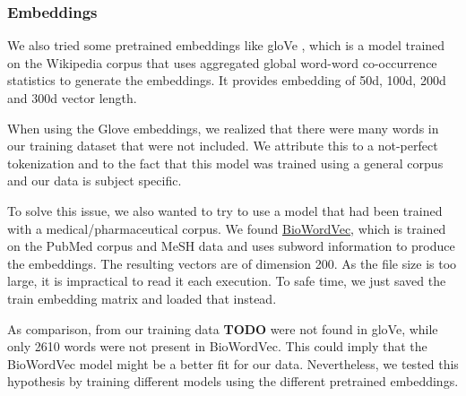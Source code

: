 \subsubsection{Embeddings}
We also tried some pretrained embeddings like gloVe \cite{glove}, which is a model trained on the Wikipedia corpus that uses aggregated global word-word co-occurrence statistics to generate the embeddings. It provides embedding of 50d, 100d, 200d and 300d vector length. 

When using the Glove embeddings, we realized that there were many words in our training dataset that were not included. We attribute this to a not-perfect tokenization and to the fact that this model was trained using a general corpus and our data is subject specific.

To solve this issue, we also wanted to try to use a model that had been trained with a medical/pharmaceutical corpus. We found \href{https://github.com/ncbi-nlp/BioWordVec}{BioWordVec}, which is trained on the PubMed corpus and MeSH data and uses subword information to produce the embeddings. The resulting vectors are of dimension 200. As the file size is too large, it is impractical to read it each execution. To safe time, we just saved the train embedding matrix and loaded that instead.

As comparison, from our training data \textbf{TODO} were not found in gloVe, while only 2610 words were not present in BioWordVec. This could imply that the BioWordVec model might be a better fit for our data. Nevertheless, we tested this hypothesis by training different models using the different pretrained embeddings.



\label{sub:nerc-experiments}

